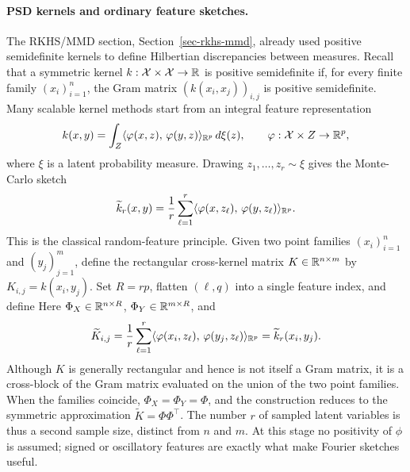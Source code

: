 \paragraph{PSD kernels and ordinary feature sketches.}
The RKHS/MMD section, Section~\ref{sec-rkhs-mmd}, already used positive semidefinite kernels to define Hilbertian discrepancies between measures. Recall that a symmetric kernel \(k:\mathcal{X}\times\mathcal{X}\to\mathbb{R}\) is positive semidefinite if, for every finite family \((x_i)_{i=1}^n\), the Gram matrix \((k(x_i,x_j))_{i,j}\) is positive semidefinite. Many scalable kernel methods start from an integral feature representation
\[
	k(x,y)=\int_Z \langle \varphi(x,z),\,\varphi(y,z)\rangle_{\mathbb{R}^p}\,d\xi(z),
	\qquad
	\varphi:\mathcal{X}\times Z\to\mathbb{R}^p,
\]
where \(\xi\) is a latent probability measure. Drawing \(z_1,\ldots,z_r\sim\xi\) gives the Monte-Carlo sketch
\[
	\widetilde k_r(x,y)
	=
	\frac1r\sum_{\ell=1}^r
	\langle \varphi(x,z_\ell),\,\varphi(y,z_\ell)\rangle_{\mathbb{R}^p}.
\]
This is the classical random-feature principle. Given two point families \((x_i)_{i=1}^n\) and \((y_j)_{j=1}^m\), define the rectangular cross-kernel matrix \(K\in\mathbb{R}^{n\times m}\) by \(K_{i,j}=k(x_i,y_j)\). Set \(R=rp\), flatten \((\ell,q)\) into a single feature index, and define
Here \(\Phi_X\in\mathbb{R}^{n\times R}\), \(\Phi_Y\in\mathbb{R}^{m\times R}\), and
\[
	\widetilde K_{i,j}
	=
	\frac1r\sum_{\ell=1}^r
	\langle \varphi(x_i,z_\ell),\,\varphi(y_j,z_\ell)\rangle_{\mathbb{R}^p}
	=
	\widetilde k_r(x_i,y_j).
\]
Although \(K\) is generally rectangular and hence is not itself a Gram matrix, it is a cross-block of the Gram matrix evaluated on the union of the two point families. When the families coincide, \(\Phi_X=\Phi_Y=\Phi\), and the construction reduces to the symmetric approximation \(\widetilde K=\Phi\Phi^\top\). The number \(r\) of sampled latent variables is thus a second sample size, distinct from \(n\) and \(m\). At this stage no positivity of \(\phi\) is assumed; signed or oscillatory features are exactly what make Fourier sketches useful.

